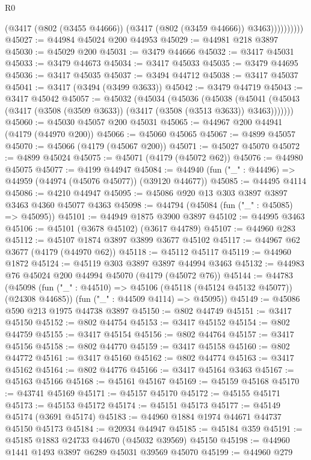 \begin{lexlean}{R0}
\begin{coremodule}
                    (@3417 (@802 (@3455 @44666)) (@3417 (@802 (@3459 @44666)) @3463))))))))))
@45027 := @44984 @45024 @200 @44953
@45029 := @44981 @218 @3897
@45030 := @45029 @200
@45031 := @3479 @44666
@45032 := @3417 @45031
@45033 := @3479 @44673
@45034 := @3417 @45033
@45035 := @3479 @44695
@45036 := @3417 @45035
@45037 := @3494 @44712
@45038 := @3417 @45037
@45041 := @3417 (@3494 (@3499 @3633))
@45042 := @3479 @44719
@45043 := @3417 @45042
@45057 := @45032
    (@45034
      (@45036
        (@45038
          (@45041 (@45043 (@3417 (@3508 (@3509 @3633)) (@3417 (@3508 (@3513 @3633)) @3463)))))))
@45060 := @45030 @45057 @200 @45031
@45065 := @44967 @200 @44941 (@4179 (@44970 @200))
@45066 := @45060 @45065
@45067 := @4899 @45057
@45070 := @45066 (@4179 (@45067 @200))
@45071 := @45027 @45070
@45072 := @4899 @45024
@45075 := @45071 (@4179 (@45072 @62))
@45076 := @44980 @45075
@45077 := @4199 @44947
@45084 := @44940 (fun ("_" : @44496) => @44959 (@44974 (@45076 @45077)) (@39120 @44677))
@45085 := @44495 @4114
@45086 := @4210 @44947
@45095 := @45086 @920 @13 @303 @3897 @3897 @3463 @4360 @45077 @4363
@45098 := @44794 (@45084 (fun ("_" : @45085) => @45095))
@45101 := @44949 @1875 @3900 @3897
@45102 := @44995 @3463
@45106 := @45101 (@3678 @45102) (@3617 @44789)
@45107 := @44960 @283
@45112 := @45107 @1874 @3897 @3899 @3677 @45102
@45117 := @44967 @62 @3677 (@4179 (@44970 @62))
@45118 := @45112 @45117
@45119 := @44960 @1872
@45124 := @45119 @303 @3897 @3897 @44994 @3463
@45132 := @44983 @76 @45024 @200 @44994 @45070 (@4179 (@45072 @76))
@45144 := @44783
    (@45098
      (fun ("_" : @44510) => @45106 (@45118 (@45124 @45132 @45077)) (@24308 @44685))
      (fun ("_" : @44509 @4114) => @45095))
@45149 := @45086 @590 @213 @1975 @44738 @3897
@45150 := @802 @44749
@45151 := @3417 @45150
@45152 := @802 @44754
@45153 := @3417 @45152
@45154 := @802 @44759
@45155 := @3417 @45154
@45156 := @802 @44764
@45157 := @3417 @45156
@45158 := @802 @44770
@45159 := @3417 @45158
@45160 := @802 @44772
@45161 := @3417 @45160
@45162 := @802 @44774
@45163 := @3417 @45162
@45164 := @802 @44776
@45166 := @3417 @45164 @3463
@45167 := @45163 @45166
@45168 := @45161 @45167
@45169 := @45159 @45168
@45170 := @43741 @45169
@45171 := @45157 @45170
@45172 := @45155 @45171
@45173 := @45153 @45172
@45174 := @45151 @45173
@45177 := @45149 @45174 (@3691 @45174)
@45183 := @44960 @1884 @1974 @44671 @44737 @45150 @45173
@45184 := @20934 @44947
@45185 := @45184 @359
@45191 := @45185 @1883 @24733 @44670 (@45032 @39569) @45150
@45198 := @44960 @1441 @1493 @3897 @6289 @45031 @39569 @45070
@45199 := @44960 @279

\end{coremodule}
\end{lexlean}
